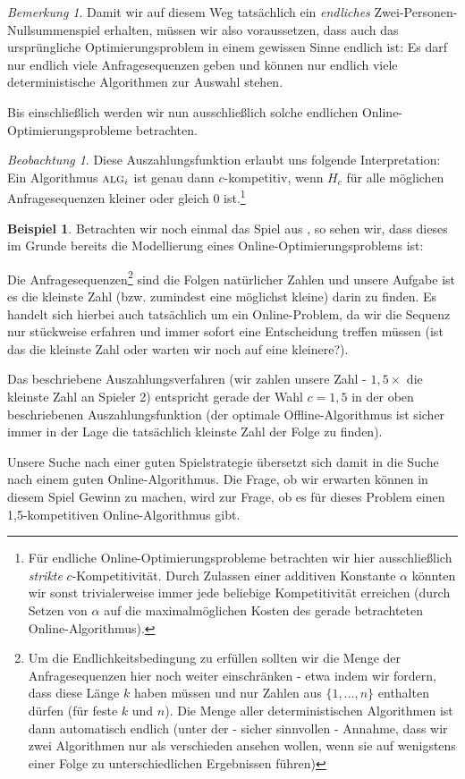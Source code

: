 \documentclass[a4paper,ngerman,12pt,bibtotoc]{scrartcl}
\theoremstyle{definition}
\newtheorem{bsp}[defn]{Beispiel}
\theoremstyle{plain}
\theoremstyle{remark}
\newtheorem{bem}[defn]{Bemerkung}
\newtheorem{beob}[defn]{Beobachtung}
\renewcommand{\_}{\mathpunct{.}\,}
\newcommand{\?}{\,{:}\,}
\newcommand{\Alg}{\ensuremath{\textsc{alg}}}
\newcommand{\Hf}{H}
\newcommand{\ZPNS}{Zwei-Personen-Nullsummenspiel }
\begin{document}
	\begin{bem}
		Damit wir auf diesem Weg tatsächlich ein \emph{endliches} \ZPNS erhalten, müssen wir also voraussetzen, dass auch das ursprüngliche Optimierungsproblem in einem gewissen Sinne endlich ist: Es darf nur endlich viele Anfragesequenzen geben und können nur endlich viele deterministische Algorithmen zur Auswahl stehen.
		
		Bis einschließlich  werden wir nun ausschließlich solche endlichen Online-Optimierungsprobleme betrachten.
	\end{bem}
	
	\begin{beob}
		Diese Auszahlungsfunktion erlaubt uns folgende Interpretation: Ein Algorithmus $\Alg_i$ ist genau dann $c$-kompetitiv, wenn $\Hf_c$ für alle möglichen Anfragesequenzen kleiner oder gleich 0 ist.\footnote{Für endliche Online-Optimierungsprobleme betrachten wir hier ausschließlich \emph{strikte} $c$-Kompetitivität. Durch Zulassen einer additiven Konstante $\alpha$ könnten wir sonst trivialerweise immer jede beliebige Kompetitivität erreichen (durch Setzen von $\alpha$ auf die maximalmöglichen Kosten des gerade betrachteten Online-Algorithmus). }
	\end{beob}
	
	\begin{bsp}\label{bsp:Teil2}
		Betrachten wir noch einmal das Spiel aus , so sehen wir, dass dieses im Grunde bereits die Modellierung eines Online-Optimierungsproblems ist: 
		
		Die Anfragesequenzen\footnote{Um die Endlichkeitsbedingung zu erfüllen sollten wir die Menge der Anfragesequenzen hier noch weiter einschränken - etwa indem wir fordern, dass diese Länge $k$ haben müssen und nur Zahlen aus $\{1, \dots, n\}$ enthalten dürfen (für feste $k$ und $n$). Die Menge aller deterministischen Algorithmen ist dann automatisch endlich (unter der - sicher sinnvollen - Annahme, dass wir zwei Algorithmen nur als verschieden ansehen wollen, wenn sie auf wenigstens einer Folge zu unterschiedlichen Ergebnissen führen)} sind die Folgen natürlicher Zahlen und unsere Aufgabe ist es die kleinste Zahl (bzw. zumindest eine möglichst kleine) darin zu finden. Es handelt sich hierbei auch tatsächlich um ein Online-Problem, da wir die Sequenz nur stückweise erfahren und immer sofort eine Entscheidung treffen müssen (ist das die kleinste Zahl oder warten wir noch auf eine kleinere?).
		
		Das beschriebene Auszahlungsverfahren (wir zahlen unsere Zahl - $1,5\times$ die kleinste Zahl an Spieler 2) entspricht gerade der Wahl $c=1,5$ in der oben beschriebenen Auszahlungsfunktion (der optimale Offline-Algorithmus ist sicher immer in der Lage die tatsächlich kleinste Zahl der Folge zu finden).
		
		Unsere Suche nach einer guten Spielstrategie übersetzt sich damit in die Suche nach einem guten Online-Algorithmus. Die Frage, ob wir erwarten können in diesem Spiel Gewinn zu machen, wird zur Frage, ob es für dieses Problem einen 1,5-kompetitiven Online-Algorithmus gibt.
	\end{bsp}
	
\end{document}
